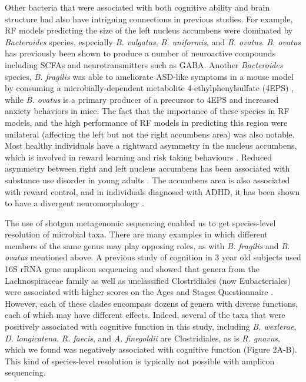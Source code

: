 \documentclass{article}
\begin{document}
Other bacteria that were associated with both cognitive ability and
brain structure had also have intriguing connections in previous studies.
For example, RF models predicting the size of the left nucleus accumbens
were dominated by \textit{Bacteroides} species,
especially \textit{B. vulgatus}, \textit{B. uniformis}, and \textit{B. ovatus}.
\textit{B. ovatus} has previously been shown to produce
a number of neuroactive compounds including SCFAs and neurotransmitters
such as GABA\cite{horvathBacteroidesOvatusColonization2022}.
Another \textit{Bacteroides} species, \textit{B. fragilis} was
able to ameliorate ASD-like symptoms in a mouse model
by consuming a microbially-dependent metabolite 4-ethylphenylsulfate (4EPS)
\cite{hsiaoMicrobiotaModulateBehavioral2013},
while \textit{B. ovatus} is a primary producer of a precursor to 4EPS
\cite{needhamGutderivedMetaboliteAlters2022} and increased anxiety
behaviors in mice.
The fact that the importance of these species in RF models,
and the high performance of RF models in predicting this region
were unilateral (affecting the left but not the right accumbens area)
was also notable. Most healthy individuals have a
rightward asymmetry in the nucleus accumbens,
which is involved in reward learning and risk taking behaviours
\cite{ernstAmygdalaNucleusAccumbens2005,yauNucleusAccumbensResponse2012}.
Reduced asymmetry between right and left nucleus accumbens
has been associated with substance use disorder in young adults
\cite{caoMappingCorticalSubcortical2021}. The accumbens area is also
associated with reward control, and in individuals diagnosed with ADHD,
it has been shown to have a divergent neuromorphology
\cite{hoogmanSubcorticalBrainVolume2017}.

The use of shotgun metagenomic sequencing enabled us to get
species-level resolution of microbial taxa. There are many examples
in which different members of the same genus may play opposing roles,
as with \textit{B. fragilis} and \textit{B. ovatus} mentioned above.
A previous study of
cognition in 3 year old subjects used 16S rRNA gene amplicon sequencing
and showed that genera from the Lachnospiraceae family as well as
unclassified Clostridiales (now Eubacteriales) were associated with
higher scores on the Ages and Stages Questionnaire
\cite{sordilloAssociationInfantGut2019}.
However, each of these clades encompass dozens of genera with
diverse functions, each of which may have different effects. Indeed,
several of the taxa that were positively associated with cognitive
function in this study, including \emph{B. wexlerae}, \emph{D.
longicatena}, \emph{R. faecis}, and \emph{A. finegoldii} are
Clostridiales, as is \emph{R. gnavus}, which we found was negatively
associated with cognitive function (Figure 2A-B). This kind of
species-level resolution is typically not possible with amplicon
sequencing.
\end{document}
